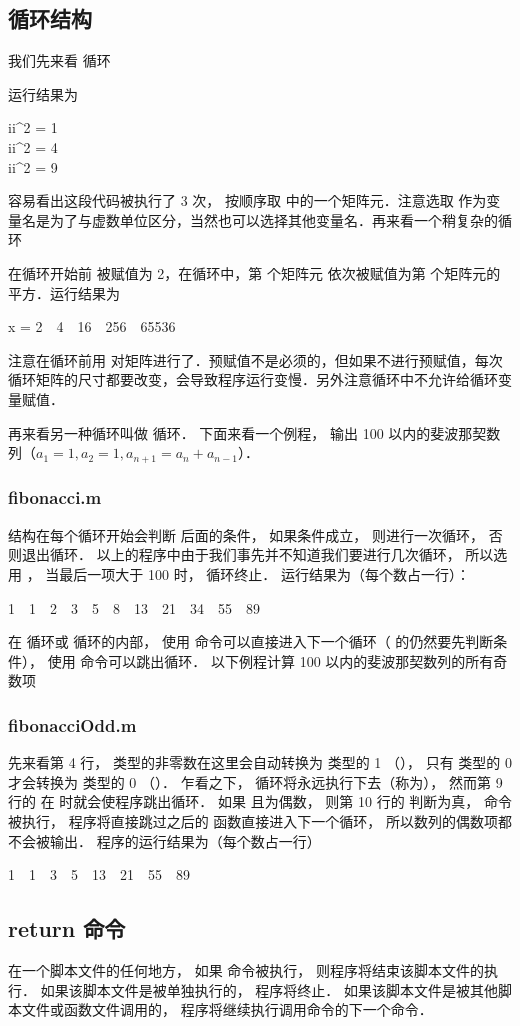 \subsection{循环结构}
我们先来看  循环

运行结果为
\begin{Command}
ii\^{}2 = 1 \\
ii\^{}2 = 4 \\
ii\^{}2 = 9 
\end{Command}
容易看出这段代码被执行了 3 次，  按顺序取  中的一个矩阵元．注意选取  作为变量名是为了与虚数单位区分，当然也可以选择其他变量名．再来看一个稍复杂的循环

在循环开始前  被赋值为 2，在循环中，第  个矩阵元 依次被赋值为第  个矩阵元的平方．运行结果为
\begin{Command}
x = 2\ \ 4\ \ 16\ \ 256\ \ 65536
\end{Command}
注意在循环前用  对矩阵进行了．预赋值不是必须的，但如果不进行预赋值，每次循环矩阵的尺寸都要改变，会导致程序运行变慢．另外注意循环中不允许给循环变量赋值．

再来看另一种循环叫做  循环． 下面来看一个例程， 输出 100 以内的斐波那契数列（$a_1 = 1, a_2 = 1, a_{n+1} = a_{n} + a_{n-1}$）．

\subsubsection{fibonacci.m}

 结构在每个循环开始会判断  后面的条件， 如果条件成立， 则进行一次循环， 否则退出循环． 以上的程序中由于我们事先并不知道我们要进行几次循环， 所以选用 ， 当最后一项大于 100 时， 循环终止． 运行结果为（每个数占一行）：
\begin{Command}
1\ \ 1\ \ 2\ \ 3\ \ 5\ \ 8\ \ 13\ \ 21\ \ 34\ \ 55\ \ 89
\end{Command}

在  循环或  循环的内部， 使用  命令可以直接进入下一个循环（ 的仍然要先判断条件）， 使用  命令可以跳出循环． 以下例程计算 100 以内的斐波那契数列的所有奇数项

\subsubsection{fibonacciOdd.m}

先来看第 4 行，  类型的非零数在这里会自动转换为  类型的 1 （）， 只有  类型的 0 才会转换为  类型的 0 （）． 乍看之下，  循环将永远执行下去（称为）， 然而第 9 行的  在  时就会使程序跳出循环． 如果  且为偶数， 则第 10 行的  判断为真，  命令被执行， 程序将直接跳过之后的  函数直接进入下一个循环， 所以数列的偶数项都不会被输出． 程序的运行结果为（每个数占一行）
\begin{Command}
1\ \ 1\ \ 3\ \ 5\ \ 13\ \ 21\ \ 55\ \ 89
\end{Command}

\subsection{return 命令}
在一个脚本文件的任何地方， 如果  命令被执行， 则程序将结束该脚本文件的执行． 如果该脚本文件是被单独执行的， 程序将终止． 如果该脚本文件是被其他脚本文件或函数文件调用的， 程序将继续执行调用命令的下一个命令．



